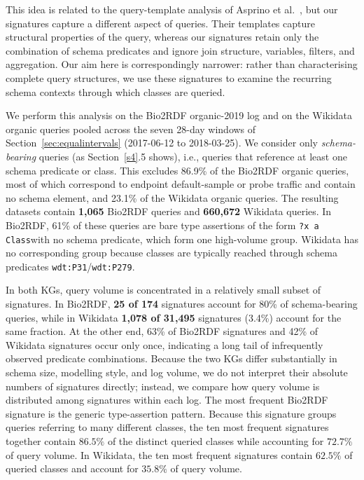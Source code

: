 \documentclass[sw]{iosart2x}
\begin{document}
This idea is related to the query-template analysis of Asprino et al.~\cite{asprino2023your}, but our signatures capture a different aspect of queries. Their templates capture structural properties of the query, whereas our signatures retain only the combination of schema predicates and ignore join structure, variables, filters, and aggregation. Our aim here is correspondingly narrower: rather than characterising complete query structures, we use these signatures to examine the recurring schema contexts through which classes are queried.


We perform this analysis on the Bio2RDF organic-2019 log and on the Wikidata organic queries pooled across the seven 28-day windows of Section~\ref{sec:equalintervals} (2017-06-12 to 2018-03-25). We consider only \emph{schema-bearing} queries (as Section~\ref{s4}.5 shows), i.e., queries that reference at least one schema predicate or class. This excludes 86.9\% of the Bio2RDF organic queries, most of which correspond to endpoint default-sample or probe traffic and contain no schema element, and 23.1\% of the Wikidata organic queries. The resulting datasets contain \textbf{1{,}065} Bio2RDF queries and \textbf{660{,}672} Wikidata queries. In Bio2RDF, 61\% of these queries are bare type assertions of the form \texttt{?x a Class}with no schema predicate, which form one high-volume group. Wikidata has no corresponding group because classes are typically reached through schema predicates \texttt{wdt:P31}/\texttt{wdt:P279}.


In both KGs, query volume is concentrated in a relatively small subset of signatures. In Bio2RDF, \textbf{25 of 174} signatures account for 80\% of schema-bearing queries, while in Wikidata \textbf{1{,}078 of 31{,}495} signatures (3.4\%) account for the same fraction. At the other end, 63\% of Bio2RDF signatures and 42\% of Wikidata signatures occur only once, indicating a long tail of infrequently observed predicate combinations. Because the two KGs differ substantially in schema size, modelling style, and log volume, we do not interpret their absolute numbers of signatures directly; instead, we compare how query volume is distributed among signatures within each log.
The most frequent Bio2RDF signature is the generic type-assertion pattern. Because this signature groups queries referring to many different classes, the ten most frequent signatures together contain $86.5\%$ of the distinct queried classes while accounting for $72.7\%$ of query volume. In Wikidata, the ten most frequent signatures contain $62.5\%$ of queried classes and account for $35.8\%$ of query volume.
\end{document}

